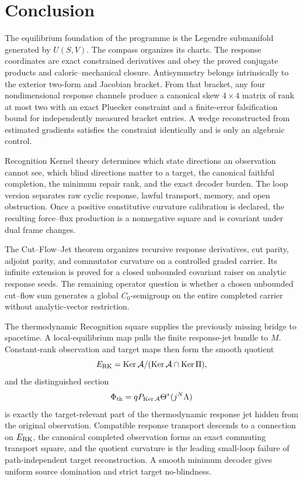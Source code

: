 \section{Conclusion}

The equilibrium foundation of the programme is the Legendre submanifold generated by $U(S,V)$.  The compass organizes its charts.  The response coordinates are exact constrained derivatives and obey the proved conjugate products and caloric--mechanical closure.  Antisymmetry belongs intrinsically to the exterior two-form and Jacobian bracket.  From that bracket, any four nondimensional response channels produce a canonical skew $4\times4$ matrix of rank at most two with an exact Pluecker constraint and a finite-error falsification bound for independently measured bracket entries. A wedge reconstructed from estimated gradients satisfies the constraint identically and is only an algebraic control.

Recognition Kernel theory determines which state directions an observation cannot see, which blind directions matter to a target, the canonical faithful completion, the minimum repair rank, and the exact decoder burden.  The loop version separates raw cyclic response, lawful transport, memory, and open obstruction.  Once a positive constitutive curvature calibration is declared, the resulting force--flux production is a nonnegative square and is covariant under dual frame changes.

The Cut--Flow--Jet theorem organizes recursive response derivatives, cut parity, adjoint parity, and commutator curvature on a controlled graded carrier.  Its infinite extension is proved for a closed unbounded covariant raiser on analytic response seeds.  The remaining operator question is whether a chosen unbounded cut--flow sum generates a global $C_0$-semigroup on the entire completed carrier without analytic-vector restriction.

The thermodynamic Recognition square supplies the previously missing bridge to spacetime.  A local-equilibrium map pulls the finite response-jet bundle to $M$.  Constant-rank observation and target maps then form the smooth quotient
\[
E_{\mathrm{RK}}=\operatorname{Ker}\mathcal A/(\operatorname{Ker}\mathcal A\cap\operatorname{Ker}\Pi),
\]
and the distinguished section
\[
\Phi_{\mathrm{th}}=qP_{\operatorname{Ker}\mathcal A}\Theta^*(j^N\Lambda)
\]
is exactly the target-relevant part of the thermodynamic response jet hidden from the original observation.  Compatible response transport descends to a connection on $E_{\mathrm{RK}}$, the canonical completed observation forms an exact commuting transport square, and the quotient curvature is the leading small-loop failure of path-independent target reconstruction.  A smooth minimum decoder gives uniform source domination and strict target no-blindness.

